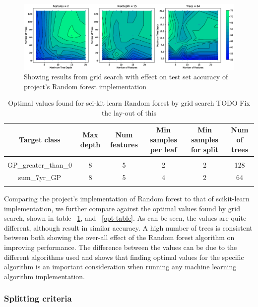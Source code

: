 \documentclass{article} %
\begin{document}
\begin{figure}[ht]
\includegraphics[width=1.1\textwidth]{gridSClass}
\caption{Showing results from grid search with effect on test set accuracy of project's Random forest implementation}
\label{fig:gridSClass}
\end{figure}

\begin{table}[h]
\caption{Optimal values found for sci-kit learn Random forest by grid search TODO Fix the lay-out of this}
\begin{center}
\begin{tabular}{cccccc}
{\bf Target class} &{\bf Max depth} &{\bf Num features} &{\bf Min samples per leaf} &{\bf Min samples for split} &{\bf Num of trees}
\\ \hline \\
GP\_greater\_than\_0         &8	&5	&2	&2	&128 \\
sum\_7yr\_GP         &8	&5	&4	&2	&64 \\
\label{scikit-table}
\end{tabular}
\end{center}
\end{table}

Comparing the project's implementation of Random forest to that of scikit-learn implementation, we further compare against the optimal values found by grid search, shown in table ~\ref{scikit-table}, and ~\ref{opt-table}. As can be seen, the values are quite different, although result in similar accuracy. A high number of trees is consistent between both showing the over-all effect of the Random forest algorithm on improving performance. The difference between the values can be due to the different algorithms used and shows that finding optimal values for the specific algorithm is an important consideration when running any machine learning algorithm implementation. 

\subsubsection{Splitting criteria}
\end{document}
